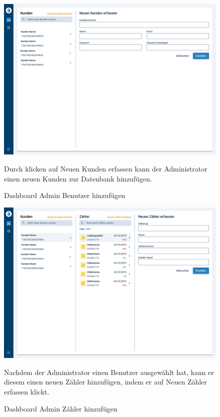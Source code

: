 \begin{figure}[h]
	\centering
    \includegraphics[scale=0.3]{img/WebsiteMockup/Dashboard-Admin-AddUser}
	\caption{Dashboard Admin Benutzer hinzufügen} \hfill \break
	Durch klicken auf Neuen Kunden erfassen kann der Administrator einen neuen Kunden zur Datenbank hinzufügen.
\end{figure}

\newpage

\begin{figure}[h]
	\centering
    \includegraphics[scale=0.3]{img/WebsiteMockup/Dashboard-Admin-AddZahler}
	\caption{Dashboard Admin Zähler hinzufügen} \hfill \break
	Nachdem der Administrator einen Benutzer ausgewählt hat, kann er diesem einen neuen Zähler hinzufügen, indem er auf Neuen Zähler erfassen klickt.
\end{figure}

